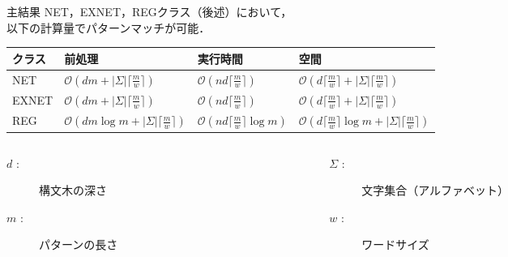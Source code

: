 \documentclass[dvipdfmx,12pt,beamer]{standalone}
\begin{document}
\begin{frame}{主結果}
  \textsf{NET}，\textsf{EXNET}，\textsf{REG}クラス（後述）において，\\以下の計算量でパターンマッチが可能．
  \begin{center}
    \scriptsize
    \begin{tabular}{|l|l|l|l|}\hline
      クラス & 前処理 & 実行時間 & 空間 \\\hline
      \textsf{NET} & $\mathcal{O}\left(dm + |\Sigma|\lceil \frac{m}{w} \rceil \right)$ & $\mathcal{O}\left(nd\lceil \frac{m}{w} \rceil \right)$ & $\mathcal{O}\left(d\lceil \frac{m}{w} \rceil + |\Sigma|\lceil \frac{m}{w} \rceil \right)$ \\\hline
      \textsf{EXNET} & $\mathcal{O}\left(dm + |\Sigma|\lceil \frac{m}{w} \rceil \right)$ & $\mathcal{O}\left(nd\lceil \frac{m}{w} \rceil \right)$ & $\mathcal{O}\left(d\lceil \frac{m}{w} \rceil + |\Sigma|\lceil \frac{m}{w} \rceil \right)$ \\\hline
      \textsf{REG} & $\mathcal{O}\left(dm\log m + |\Sigma|\lceil \frac{m}{w} \rceil \right)$ & $\mathcal{O}\left(nd\lceil \frac{m}{w} \rceil \log m \right)$ & $\mathcal{O}\left(d\lceil \frac{m}{w} \rceil \log m + |\Sigma|\lceil \frac{m}{w} \rceil \right)$ \\\hline
    \end{tabular}
  \end{center}
  \begin{columns}[t]
    \scriptsize
    \begin{column}{0.4\linewidth}
      \begin{description}
        \item[$d$ :] 構文木の深さ
        \item[$m$ :] パターンの長さ
      \end{description}
    \end{column}
    \begin{column}{0.59\linewidth}
      \begin{description}
        \item[$\Sigma$ :] 文字集合（アルファベット）
        \item[$w$ :] ワードサイズ
      \end{description}
    \end{column}
  \end{columns}
\end{frame}
\end{document}

